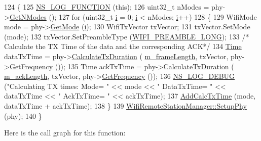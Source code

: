 \begin{DoxyCode}
124 \{
125   \hyperlink{log-macros-disabled_8h_a90b90d5bad1f39cb1b64923ea94c0761}{NS\_LOG\_FUNCTION} (\textcolor{keyword}{this});
126   uint32\_t nModes = phy->\hyperlink{classns3_1_1WifiPhy_a2467e56b69d64bb2d648302f39397317}{GetNModes} ();
127   \textcolor{keywordflow}{for} (uint32\_t \hyperlink{bernuolliDistribution_8m_a6f6ccfcf58b31cb6412107d9d5281426}{i} = 0; \hyperlink{bernuolliDistribution_8m_a6f6ccfcf58b31cb6412107d9d5281426}{i} < nModes; \hyperlink{bernuolliDistribution_8m_a6f6ccfcf58b31cb6412107d9d5281426}{i}++)
128     \{
129       WifiMode mode = phy->\hyperlink{classns3_1_1WifiPhy_ac35983a13a769a7fbaac43340b8cdaf2}{GetMode} (\hyperlink{bernuolliDistribution_8m_a6f6ccfcf58b31cb6412107d9d5281426}{i});
130       WifiTxVector txVector;
131       txVector.SetMode (mode);
132       txVector.SetPreambleType (\hyperlink{group__wifi_gga5e94a56cb338a14ffbbb19c6a41251eba12f3d9468d1630bd38bbef20df1e3eda}{WIFI\_PREAMBLE\_LONG});
133       \textcolor{comment}{/* Calculate the TX Time of the data and the corresponding ACK*/}
134       \hyperlink{namespacens3_1_1TracedValueCallback_a7ffd3e7c142ffe7c8a1d2db9b8de38ec}{Time} dataTxTime = phy->\hyperlink{classns3_1_1WifiPhy_aee98c7241bb4f0bb8e6d90f5771dacc7}{CalculateTxDuration} (
      \hyperlink{classns3_1_1RraaWifiManager_a43b8fc3fb7d677b03aaaf6803149b99e}{m\_frameLength}, txVector, phy->\hyperlink{classns3_1_1WifiPhy_ad2508d94faf22d690d6b8b4367934fd1}{GetFrequency} ());
135       \hyperlink{namespacens3_1_1TracedValueCallback_a7ffd3e7c142ffe7c8a1d2db9b8de38ec}{Time} ackTxTime = phy->\hyperlink{classns3_1_1WifiPhy_aee98c7241bb4f0bb8e6d90f5771dacc7}{CalculateTxDuration} (
      \hyperlink{classns3_1_1RraaWifiManager_ad99aa645ea8516cfa020d22facb7934d}{m\_ackLength}, txVector, phy->\hyperlink{classns3_1_1WifiPhy_ad2508d94faf22d690d6b8b4367934fd1}{GetFrequency} ());
136       \hyperlink{group__logging_ga413f1886406d49f59a6a0a89b77b4d0a}{NS\_LOG\_DEBUG} (\textcolor{stringliteral}{"Calculating TX times: Mode= "} << mode << \textcolor{stringliteral}{" DataTxTime= "} << dataTxTime << \textcolor{stringliteral}{
      " AckTxTime= "} << ackTxTime);
137       \hyperlink{classns3_1_1RraaWifiManager_a58b7e6351bcffe8729566330a1fca38b}{AddCalcTxTime} (mode, dataTxTime + ackTxTime);
138     \}
139   \hyperlink{classns3_1_1WifiRemoteStationManager_a823deffface82c9fe1daa06ce11c585b}{WifiRemoteStationManager::SetupPhy} (phy);
140 \}
\end{DoxyCode}


Here is the call graph for this function\+:


